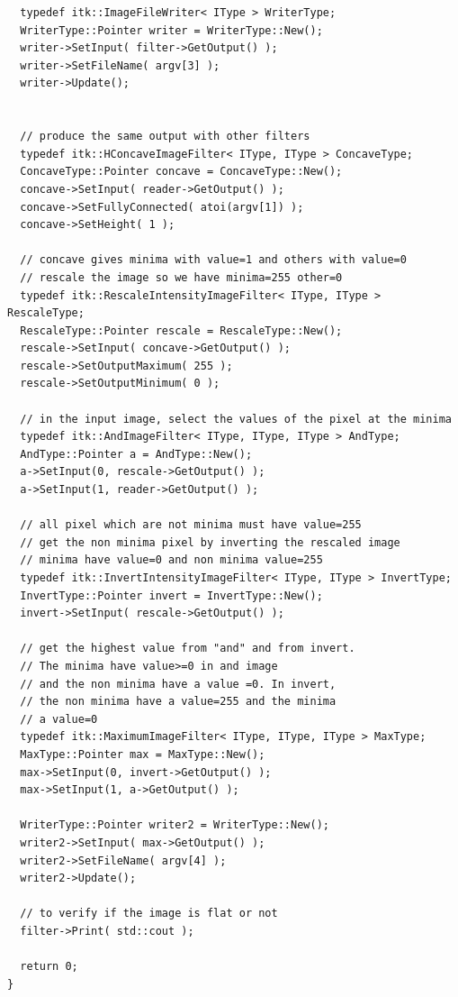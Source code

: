 \documentclass{llncs}
\begin{document}
\begin{lstlisting}
  typedef itk::ImageFileWriter< IType > WriterType;
  WriterType::Pointer writer = WriterType::New();
  writer->SetInput( filter->GetOutput() );
  writer->SetFileName( argv[3] );
  writer->Update();


  // produce the same output with other filters
  typedef itk::HConcaveImageFilter< IType, IType > ConcaveType;
  ConcaveType::Pointer concave = ConcaveType::New();
  concave->SetInput( reader->GetOutput() );
  concave->SetFullyConnected( atoi(argv[1]) );
  concave->SetHeight( 1 );

  // concave gives minima with value=1 and others with value=0
  // rescale the image so we have minima=255 other=0
  typedef itk::RescaleIntensityImageFilter< IType, IType > RescaleType;
  RescaleType::Pointer rescale = RescaleType::New();
  rescale->SetInput( concave->GetOutput() );
  rescale->SetOutputMaximum( 255 );
  rescale->SetOutputMinimum( 0 );

  // in the input image, select the values of the pixel at the minima
  typedef itk::AndImageFilter< IType, IType, IType > AndType;
  AndType::Pointer a = AndType::New();
  a->SetInput(0, rescale->GetOutput() );
  a->SetInput(1, reader->GetOutput() );

  // all pixel which are not minima must have value=255
  // get the non minima pixel by inverting the rescaled image
  // minima have value=0 and non minima value=255
  typedef itk::InvertIntensityImageFilter< IType, IType > InvertType;
  InvertType::Pointer invert = InvertType::New();
  invert->SetInput( rescale->GetOutput() );

  // get the highest value from "and" and from invert. 
  // The minima have value>=0 in and image
  // and the non minima have a value =0. In invert, 
  // the non minima have a value=255 and the minima
  // a value=0
  typedef itk::MaximumImageFilter< IType, IType, IType > MaxType;
  MaxType::Pointer max = MaxType::New();
  max->SetInput(0, invert->GetOutput() );
  max->SetInput(1, a->GetOutput() );

  WriterType::Pointer writer2 = WriterType::New();
  writer2->SetInput( max->GetOutput() );
  writer2->SetFileName( argv[4] );
  writer2->Update();

  // to verify if the image is flat or not
  filter->Print( std::cout );

  return 0;
}

\end{lstlisting}
\end{document}
